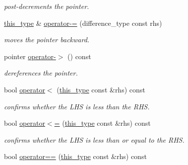 \begin{DoxyCompactItemize}
\begin{DoxyCompactList}\small\item\em post-\/decrements the pointer. \end{DoxyCompactList}\item 
\hypertarget{classhryky_1_1_offset_ptr_a5dcfac7df68c6d273ca319a8cc79352d}{\hyperlink{classhryky_1_1_offset_ptr_a73a85221d5352162be046159f4aea008}{this\-\_\-type} \& \hyperlink{classhryky_1_1_offset_ptr_a5dcfac7df68c6d273ca319a8cc79352d}{operator-\/=} (difference\-\_\-type const rhs)}\label{classhryky_1_1_offset_ptr_a5dcfac7df68c6d273ca319a8cc79352d}

\begin{DoxyCompactList}\small\item\em moves the pointer backward. \end{DoxyCompactList}\item 
\hypertarget{classhryky_1_1_offset_ptr_a8133720280b2eb94840e772e983a0620}{pointer \hyperlink{classhryky_1_1_offset_ptr_a8133720280b2eb94840e772e983a0620}{operator-\/$>$} () const }\label{classhryky_1_1_offset_ptr_a8133720280b2eb94840e772e983a0620}

\begin{DoxyCompactList}\small\item\em dereferences the pointer. \end{DoxyCompactList}\item 
\hypertarget{classhryky_1_1_offset_ptr_a666a5072ce94ef533bbcdda9f4b7ee58}{bool \hyperlink{classhryky_1_1_offset_ptr_a666a5072ce94ef533bbcdda9f4b7ee58}{operator$<$} (\hyperlink{classhryky_1_1_offset_ptr_a73a85221d5352162be046159f4aea008}{this\-\_\-type} const \&rhs) const }\label{classhryky_1_1_offset_ptr_a666a5072ce94ef533bbcdda9f4b7ee58}

\begin{DoxyCompactList}\small\item\em confirms whether the L\-H\-S is less than the R\-H\-S. \end{DoxyCompactList}\item 
\hypertarget{classhryky_1_1_offset_ptr_a389325e1ff9304e11d3eb8adacadff64}{bool \hyperlink{classhryky_1_1_offset_ptr_a389325e1ff9304e11d3eb8adacadff64}{operator$<$=} (\hyperlink{classhryky_1_1_offset_ptr_a73a85221d5352162be046159f4aea008}{this\-\_\-type} const \&rhs) const }\label{classhryky_1_1_offset_ptr_a389325e1ff9304e11d3eb8adacadff64}

\begin{DoxyCompactList}\small\item\em confirms whether the L\-H\-S is less than or equal to the R\-H\-S. \end{DoxyCompactList}\item 
\hypertarget{classhryky_1_1_offset_ptr_afe85c6946cc887fa404739699aa249c6}{bool \hyperlink{classhryky_1_1_offset_ptr_afe85c6946cc887fa404739699aa249c6}{operator==} (\hyperlink{classhryky_1_1_offset_ptr_a73a85221d5352162be046159f4aea008}{this\-\_\-type} const \&rhs) const }\label{classhryky_1_1_offset_ptr_afe85c6946cc887fa404739699aa249c6}


\end{DoxyCompactItemize}

